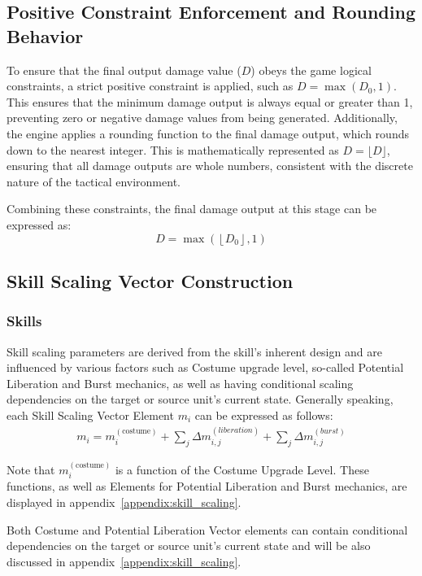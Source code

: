 \documentclass[twocolumn,10pt]{article}
\begin{document}
\subsection{Positive Constraint Enforcement and Rounding Behavior}
To ensure that the final output damage value ($D$) obeys the game logical constraints, a strict positive constraint is applied, such as $D = \max(D_0, 1)$. This ensures that the minimum damage output is always equal or greater than 1, preventing zero or negative damage values from being generated. Additionally, the engine applies a rounding function to the final damage output, which rounds down to the nearest integer. This is mathematically represented as $D = \lfloor D \rfloor$, ensuring that all damage outputs are whole numbers, consistent with the discrete nature of the tactical environment.

Combining these constraints, the final damage output at this stage can be expressed as:
\begin{equation}
D = \max\left( \left\lfloor D_0 \right\rfloor, 1 \right)
\end{equation}

\subsection{Skill Scaling Vector Construction}
\subsubsection{Skills}
Skill scaling parameters are derived from the skill's inherent design and are influenced by various factors such as Costume upgrade level, so-called Potential Liberation and Burst mechanics, as well as having conditional scaling dependencies on the target or source unit's current state. Generally speaking, each Skill Scaling Vector Element $m_i$ can be expressed as follows:
\begin{equation}
  \begin{split}
  m_i = m_i^{(\text{costume})} + \sum_j{\Delta m_{i,j}^{(liberation)}} + \sum_j{\Delta m_{i,j}^{(burst)}}
  \end{split}
\end{equation}

Note that $m_i^{(\text{costume})}$ is a function of the Costume Upgrade Level. These functions, as well as Elements for Potential Liberation and Burst mechanics, are displayed in appendix~\ref{appendix:skill_scaling}.

Both Costume and Potential Liberation Vector elements can contain conditional dependencies on the target or source unit's current state and will be also discussed in appendix~\ref{appendix:skill_scaling}.
\end{document}
